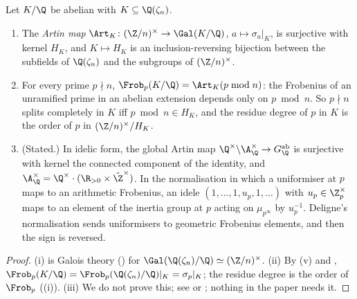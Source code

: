 \begin{theorem}\label{thm:ant:artinQ}
Let $K/\Q$ be abelian with $K\subseteq\Q(\zeta_n)$.
\begin{enumerate}[label=(\roman*)]
\item The \emph{Artin map} $\Art_K\colon(\Z/n)^\times\to\Gal(K/\Q)$, $a\mapsto\sigma_a|_K$, is surjective with kernel $H_K$, and $K\mapsto H_K$ is an
inclusion-reversing bijection between the subfields of $\Q(\zeta_n)$ and the subgroups of $(\Z/n)^\times$.
\item For every prime $p\nmid n$, $\Frob_p(K/\Q)=\Art_K(p\bmod n)$: the Frobenius of an unramified prime in an abelian extension depends only on $p\bmod n$.
So $p\nmid n$ splits completely in $K$ iff $p\bmod n\in H_K$, and the residue degree of $p$ in $K$ is the order of $p$ in $(\Z/n)^\times/H_K$.
\item (Stated.) In idelic form, the global Artin map $\Q^\times\backslash\A_\Q^\times\to G_\Q^{\mathrm{ab}}$ is surjective with kernel the connected
component of the identity, and $\A_\Q^\times=\Q^\times\cdot(\R_{>0}\times\hat\Z^\times)$. In the normalisation in which a uniformiser at $p$ maps to an
arithmetic Frobenius, an idele $(1,\dots,1,u_p,1,\dots)$ with $u_p\in\Z_p^\times$ maps to an element of the inertia group at $p$ acting on $\mu_{p^\infty}$ by
$u_p^{-1}$. Deligne's normalisation sends uniformisers to geometric Frobenius elements, and then the sign is reversed.
\end{enumerate}
\end{theorem}

\begin{proof}
(i) is Galois theory () for $\Gal(\Q(\zeta_n)/\Q)\simeq(\Z/n)^\times$. (ii) By (v) and ,
$\Frob_p(K/\Q)=\Frob_p(\Q(\zeta_n)/\Q)|_K=\sigma_p|_K$; the residue degree is the order of $\Frob_p$ ((i)). (iii) We do not prove
this; see \cite[Chapter VI, Sections 5 and 6]{Neukirch} or \cite[Chapter V]{MilneCFT}; nothing in the paper needs it.
\end{proof}

